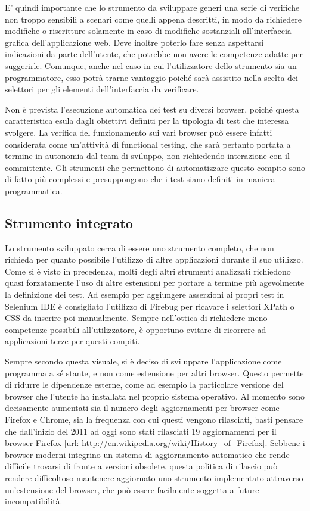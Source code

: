 \documentclass[12pt]{toptesi}
\begin{document}
E' quindi importante che lo strumento da sviluppare generi una serie di verifiche non troppo sensibili a scenari come quelli appena descritti, in modo da richiedere modifiche o riscritture solamente in caso di modifiche sostanziali all'interfaccia grafica dell'applicazione web. Deve inoltre poterlo fare senza aspettarsi indicazioni da parte dell'utente, che potrebbe non avere le competenze adatte per suggerirle. Comunque, anche nel caso in cui l'utilizzatore dello strumento sia un programmatore, esso potrà trarne vantaggio poiché sarà assistito nella scelta dei selettori per gli elementi dell'interfaccia da verificare.

Non è prevista l'esecuzione automatica dei test su diversi browser, poiché questa caratteristica esula dagli obiettivi definiti per la tipologia di test che interessa svolgere. La verifica del funzionamento sui vari browser può essere infatti considerata come un'attività di functional testing, che sarà pertanto portata a termine in autonomia dal team di sviluppo, non richiedendo interazione con il committente. Gli strumenti che permettono di automatizzare questo compito sono di fatto più complessi e presuppongono che i test siano definiti in maniera programmatica.

\subsection{Strumento integrato}

Lo strumento sviluppato cerca di essere uno strumento completo, che non richieda per quanto possibile l'utilizzo di altre applicazioni durante il suo utilizzo. Come si è visto in precedenza, molti degli altri strumenti analizzati richiedono quasi forzatamente l'uso di altre estensioni per portare a termine più agevolmente la definizione dei test. Ad esempio per aggiungere asserzioni ai propri test in Selenium IDE è consigliato l'utilizzo di Firebug per ricavare i selettori XPath o CSS da inserire poi manualmente. Sempre nell'ottica di richiedere meno competenze possibili all'utilizzatore, è opportuno evitare di ricorrere ad applicazioni terze per questi compiti.

Sempre secondo questa visuale, si è deciso di sviluppare l'applicazione come programma a sé stante, e non come estensione per altri browser. Questo permette di ridurre le dipendenze esterne, come ad esempio la particolare versione del browser che l'utente ha installata nel proprio sistema operativo. Al momento sono decisamente aumentati sia il numero degli aggiornamenti per browser come Firefox e Chrome, sia la frequenza con cui questi vengono rilasciati, basti pensare che dall'inizio del 2011 ad oggi sono stati rilasciati 19 aggiornamenti per il browser Firefox [url: http://en.wikipedia.org/wiki/History\_of\_Firefox]. Sebbene i browser moderni integrino un sistema di aggiornamento automatico che rende difficile trovarsi di fronte a versioni obsolete, questa politica di rilascio può rendere difficoltoso mantenere aggiornato uno strumento implementato attraverso un'estensione del browser, che può essere facilmente soggetta a future incompatibilità. 
\end{document}
